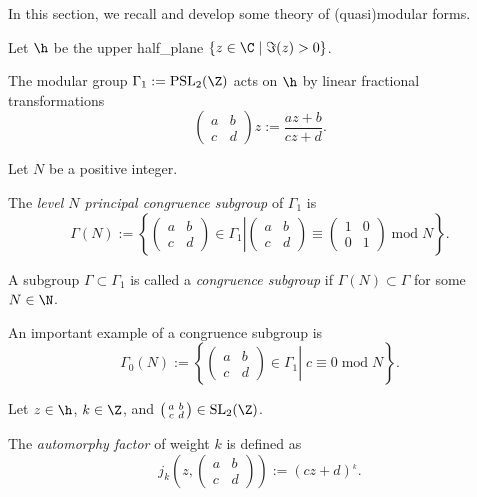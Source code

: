 
In this section, we recall and develop some theory of (quasi)modular forms.

Let $\h$ be the upper half_plane $\{z\in\C\mid\Im(z)>0\}$.
\begin{lemma}\label{def_Gamma_1_Action}
    The modular group $\Gamma_1:=\mathrm{PSL}_2(\Z)$ acts on $\h$ by linear fractional transformations
$$\left(\begin{smallmatrix}a&b\\c&d\end{smallmatrix}\right)z:=\frac{az+b}{cz+d}.$$
\end{lemma}

Let $N$ be a positive integer.
\begin{definition}\label{def_level_N_princ_cong_subgp}
    The \emph{level $N$ principal congruence subgroup} of $\Gamma_1$ is
    $$\Gamma(N):=\left\{\left.\left(\begin{smallmatrix}a&b\\c&d\end{smallmatrix}\right)\in\Gamma_1\right|\left(\begin{smallmatrix}a&b\\c&d\end{smallmatrix}\right)\equiv\left(\begin{smallmatrix}1&0\\0&1\end{smallmatrix}\right)\;\mathrm{mod}\;N\right\}.$$
\end{definition}

\begin{definition}\label{def_congruence_subgroup}
    A subgroup $\Gamma\subset\Gamma_1$ is called a \emph{congruence subgroup} if $\Gamma(N)\subset\Gamma$ for some $N\in\N$.
\end{definition}

An important example of a congruence subgroup is
$$\Gamma_0(N):=\left\{\left.\left(\begin{smallmatrix}a&b\\c&d\end{smallmatrix}\right)\in\Gamma_1\right|\;c\equiv0\;\mathrm{mod}\;N\right\}.$$

Let $z\in\h$, $k\in\Z$, and $\left(\begin{smallmatrix}a&b\\c&d\end{smallmatrix}\right)\in\mathrm{SL}_2(\Z)$.
\begin{definition}\label{def_automorphy_factor}
    The \emph{automorphy factor} of weight $k$ is defined as
$$j_k(z,\left(\begin{smallmatrix}a&b\\c&d\end{smallmatrix}\right)):=(cz+d)^{_k}.$$
\end{definition}

